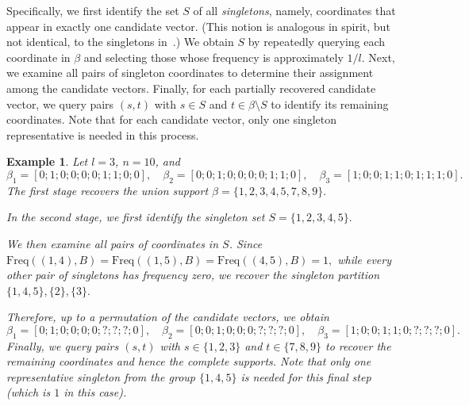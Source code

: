 \documentclass[10pt,a4paper]{amsart}
\newcommand{\xl}[1]{{\color{blue}#1}}
\newtheorem{example}{Example}[section]
\begin{document}
Specifically, we first identify the set $S$ of all \emph{singletons}, namely, coordinates that appear in exactly one candidate vector. (This notion is analogous in spirit, but not identical, to the singletons in~\cite{li2025support}.) We obtain $S$ by repeatedly querying each coordinate in $\beta$ and selecting those whose frequency is approximately $1/l$. Next, we examine all pairs of singleton coordinates to determine their assignment among the candidate vectors. Finally, for each partially recovered candidate vector, we query pairs $(s,t)$ with $s\in S$ and $t\in\beta\setminus S$ to identify its remaining coordinates. Note that for each candidate vector, only one singleton representative is needed in this process. 


\begin{example}
Let $l=3$, $n=10$, and
\[
\beta_1=[0;1;0;0;0;0;1;1;0;0],\quad
\beta_2=[0;0;1;0;0;0;0;1;1;0],\quad
\beta_3=[1;0;0;1;1;0;1;1;1;0].
\]
The first stage recovers the union support
\(
\beta=\{1,2,3,4,5,7,8,9\}.
\)

In the second stage, we first identify the singleton set
\(
S=\{1,2,3,4,5\}.
\)

We then examine all pairs of coordinates in $S$. Since
\(
\mathrm{Freq}((1,4),B)
=\mathrm{Freq}((1,5),B)
=\mathrm{Freq}((4,5),B)=1,
\)
while every other pair of singletons has frequency zero, we recover the singleton partition
\(
\{1,4,5\},\{2\},\{3\}.
\)

Therefore, up to a permutation of the candidate vectors, we obtain
\[
\beta_1=[0;1;0;0;0;0;?;?;?;0],\quad
\beta_2=[0;0;1;0;0;0;?;?;?;0],\quad
\beta_3=[1;0;0;1;1;0;?;?;?;0].
\]
Finally, we query pairs $(s,t)$ with $s\in\{1,2,3\}$ and $t\in\{7,8,9\}$ to recover the remaining coordinates and hence the complete supports. Note that only one representative singleton from the group $\{1,4,5\}$ is needed for this final step (which is $1$ in this case).
\end{example}
\end{document}
